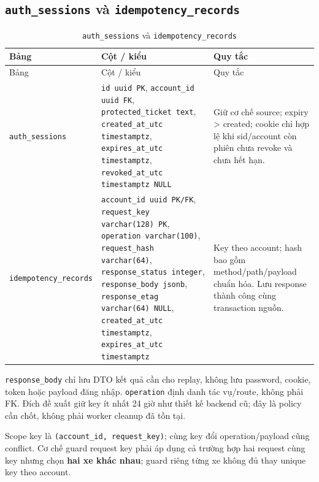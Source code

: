 \subsection{\texttt{auth\_\allowbreak{}sessions} và \texttt{idempotency\_\allowbreak{}records}}
\begin{smalltable}\begin{longtable}{L{3.0cm}L{3.2cm}L{8.2cm}}
\caption{\texttt{auth\_\allowbreak{}sessions} và \texttt{idempotency\_\allowbreak{}records}}\label{tab:dictionary-13}\\\toprule
Bảng & Cột / kiểu & Quy tắc\\\midrule\endfirsthead
\toprule Bảng & Cột / kiểu & Quy tắc\\\midrule\endhead
\texttt{auth\_\allowbreak{}sessions} & \texttt{id uuid PK}, \texttt{account\_\allowbreak{}id uuid FK}, \texttt{protected\_\allowbreak{}ticket text}, \texttt{created\_\allowbreak{}at\_\allowbreak{}utc timestamptz}, \texttt{expires\_\allowbreak{}at\_\allowbreak{}utc timestamptz}, \texttt{revoked\_\allowbreak{}at\_\allowbreak{}utc timestamptz NULL} & Giữ cơ chế source; expiry > created; cookie chỉ hợp lệ khi sid/account còn phiên chưa revoke và chưa hết hạn.\\
\texttt{idempotency\_\allowbreak{}records} & \texttt{account\_\allowbreak{}id uuid PK/FK}, \texttt{request\_\allowbreak{}key varchar(128) PK}, \texttt{operation varchar(100)}, \texttt{request\_\allowbreak{}hash varchar(64)}, \texttt{response\_\allowbreak{}status integer}, \texttt{response\_\allowbreak{}body jsonb}, \texttt{response\_\allowbreak{}etag varchar(64) NULL}, \texttt{created\_\allowbreak{}at\_\allowbreak{}utc timestamptz}, \texttt{expires\_\allowbreak{}at\_\allowbreak{}utc timestamptz} & Key theo account; hash bao gồm method/path/payload chuẩn hóa. Lưu response thành công cùng transaction nguồn.\\
\bottomrule\end{longtable}\end{smalltable}
\texttt{response\_\allowbreak{}body} chỉ lưu DTO kết quả cần cho replay, không lưu password, cookie, token hoặc payload đăng nhập. \texttt{operation} định danh tác vụ/route, không phải FK. Đích đề xuất giữ key ít nhất 24 giờ như thiết kế backend cũ; đây là policy cần chốt, không phải worker cleanup đã tồn tại.\par
Scope key là \texttt{(account\_\allowbreak{}id,\allowbreak{} request\_\allowbreak{}key)}; cùng key đổi operation/payload cũng conflict. Cơ chế guard request key phải áp dụng cả trường hợp hai request cùng key nhưng chọn \textbf{hai xe khác nhau}; guard riêng từng xe không đủ thay unique key theo account.\par
